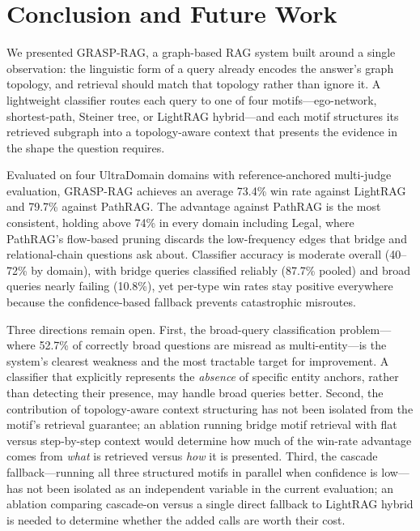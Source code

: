 \section{Conclusion and Future Work}

We presented GRASP-RAG, a graph-based RAG system built around a single
observation: the linguistic form of a query already encodes the answer's
graph topology, and retrieval should match that topology rather than ignore
it.
A lightweight classifier routes each query to one of four motifs---ego-network,
shortest-path, Steiner tree, or LightRAG hybrid---and each motif structures
its retrieved subgraph into a topology-aware context that presents the
evidence in the shape the question requires.

Evaluated on four UltraDomain domains with reference-anchored multi-judge
evaluation, GRASP-RAG achieves an average 73.4\% win rate against LightRAG
and 79.7\% against PathRAG.
The advantage against PathRAG is the most consistent, holding above 74\%
in every domain including Legal, where PathRAG's flow-based pruning discards
the low-frequency edges that bridge and relational-chain questions ask about.
Classifier accuracy is moderate overall (40--72\% by domain), with bridge
queries classified reliably (87.7\% pooled) and broad queries nearly failing
(10.8\%), yet per-type win rates stay positive everywhere because the
confidence-based fallback prevents catastrophic misroutes.

Three directions remain open.
First, the broad-query classification problem---where 52.7\% of correctly
broad questions are misread as multi-entity---is the system's clearest
weakness and the most tractable target for improvement.
A classifier that explicitly represents the \emph{absence} of specific entity
anchors, rather than detecting their presence, may handle broad queries better.
Second, the contribution of topology-aware context structuring has not been
isolated from the motif's retrieval guarantee; an ablation running bridge
motif retrieval with flat versus step-by-step context would determine how much
of the win-rate advantage comes from \emph{what} is retrieved versus \emph{how}
it is presented.
Third, the cascade fallback---running all three structured motifs in parallel
when confidence is low---has not been isolated as an independent variable in
the current evaluation; an ablation comparing cascade-on versus a single
direct fallback to LightRAG hybrid is needed to determine whether the added
calls are worth their cost.
